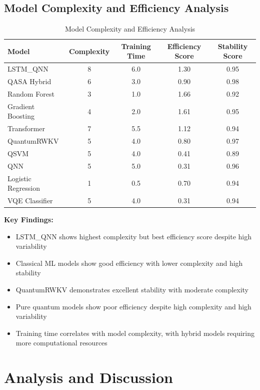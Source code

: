 \documentclass[12pt,a4paper]{article}
\begin{document}
\subsection{Model Complexity and Efficiency Analysis}

\begin{table}[H]
\centering
\begin{tabular}{@{}lcccc@{}}
\toprule
\textbf{Model} & \textbf{Complexity} & \textbf{Training Time} & \textbf{Efficiency Score} & \textbf{Stability Score} \\
\midrule
LSTM\_QNN & 8 & 6.0 & 1.30 & 0.95 \\
QASA Hybrid & 6 & 3.0 & 0.90 & 0.98 \\
Random Forest & 3 & 1.0 & 1.66 & 0.92 \\
Gradient Boosting & 4 & 2.0 & 1.61 & 0.95 \\
Transformer & 7 & 5.5 & 1.12 & 0.94 \\
QuantumRWKV & 5 & 4.0 & 0.80 & 0.97 \\
QSVM & 5 & 4.0 & 0.41 & 0.89 \\
QNN & 5 & 5.0 & 0.31 & 0.96 \\
Logistic Regression & 1 & 0.5 & 0.70 & 0.94 \\
VQE Classifier & 5 & 4.0 & 0.31 & 0.94 \\
\bottomrule
\end{tabular}
\caption{Model Complexity and Efficiency Analysis}
\end{table}

\textbf{Key Findings:}
\begin{itemize}
    \item LSTM\_QNN shows highest complexity but best efficiency score despite high variability
    \item Classical ML models show good efficiency with lower complexity and high stability
    \item QuantumRWKV demonstrates excellent stability with moderate complexity
    \item Pure quantum models show poor efficiency despite high complexity and high variability
    \item Training time correlates with model complexity, with hybrid models requiring more computational resources
\end{itemize}

\section{Analysis and Discussion}
\end{document}
